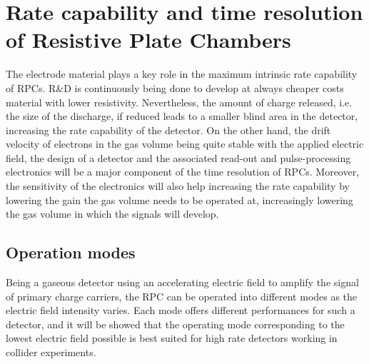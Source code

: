 \section{Rate capability and time resolution of Resistive Plate Chambers}
\label{chapt4:sec:RateCapa}

	The electrode material plays a key role in the maximum intrinsic rate capability of RPCs. R\&D is continuously being done to develop at always cheaper costs material with lower resistivity. Nevertheless, the amount of charge released, i.e. the size of the discharge, if reduced leads to a smaller blind area in the detector, increasing the rate capability of the detector. On the other hand, the drift velocity of electrons in the gas volume being quite stable with the applied electric field, the design of a detector and the associated read-out and pulse-processing electronics will be a major component of the time resolution of RPCs. Moreover, the sensitivity of the electronics will also help increasing the rate capability by lowering the gain the gas volume needs to be operated at, increasingly lowering the gas volume in which the signals will develop.
	
	\subsection{Operation modes}
	\label{chapt4:ssec:operation}
	
	Being a gaseous detector using an accelerating electric field to amplify the signal of primary charge carriers, the RPC can be operated into different modes as the electric field intensity varies. Each mode offers different performances for such a detector, and it will be showed that the operating mode corresponding to the lowest electric field possible is best suited for high rate detectors working in collider experiments.
	
